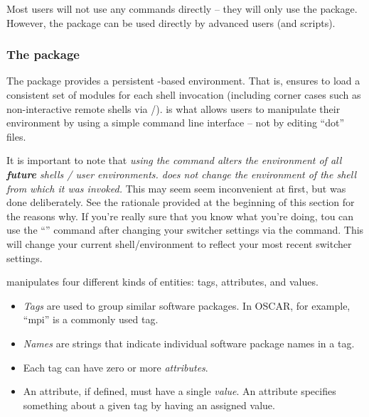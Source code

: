 Most users will not use any  commands directly -- they
will only use the  package.  However, the
 package can be used directly by advanced users (and
scripts).


\subsubsection{The  package}

The  package provides a persistent
-based environment.  That is,  ensures
to load a consistent set of modules for each shell invocation
(including corner cases such as non-interactive remote shells via
/).   is what allows users to
manipulate their environment by using a simple command line interface
-- not by editing ``dot'' files.

It is important to note that {\em using the  command
  alters the environment of all {\bf future} shells / user
  environments.   does not change the environment of the
  shell from which it was invoked.}  This may seem seem inconvenient
at first, but was done deliberately.  See the rationale provided at
the beginning of this section for the reasons why.  If you're really
sure that you know what you're doing, tou can use the
``'' command after changing your switcher
settings via the  command.  This will change your
current shell/environment to reflect your most recent switcher
settings.

 manipulates four different kinds of entities: tags,
attributes, and values.  

\begin{itemize}
\item {\em Tags} are used to group similar software packages.  In
  OSCAR, for example, ``mpi'' is a commonly used tag.
  
\item {\em Names} are strings that indicate individual software
  package names in a tag.

\item Each tag can have zero or more {\em attributes}.  
  
\item An attribute, if defined, must have a single {\em value}.  An
  attribute specifies something about a given tag by having an
  assigned value.
\end{itemize}

